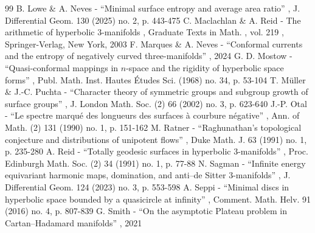 \documentclass[11pt]{article}
\theoremstyle{plain}
\theoremstyle{definition}
\begin{document}
\begin{thebibliography}{99}
 B. Lowe \& A. Neves - “Minimal surface entropy and average area ratio” , J. Differential Geom. 130 (2025) no. 2, p. 443-475
 C. Maclachlan \& A. Reid - The arithmetic of hyperbolic $3$-manifolds , Graduate Texts in Math. , vol. 219 , Springer-Verlag, New York, 2003
 F. Marques \& A. Neves - “Conformal currents and the entropy of negatively curved three-manifolds” , 2024
 G. D. Mostow - “Quasi-conformal mappings in $n$-space and the rigidity of hyperbolic space forms” , Publ. Math. Inst. Hautes Études Sci. (1968) no. 34, p. 53-104
 T. Müller \& J.-C. Puchta - “Character theory of symmetric groups and subgroup growth of surface groups” , J. London Math. Soc. (2) 66 (2002) no. 3, p. 623-640
 J.-P. Otal - “Le spectre marqué des longueurs des surfaces à courbure négative” , Ann. of Math. (2) 131 (1990) no. 1, p. 151-162
 M. Ratner - “Raghunathan’s topological conjecture and distributions of unipotent flows” , Duke Math. J. 63 (1991) no. 1, p. 235-280
 A. Reid - “Totally geodesic surfaces in hyperbolic $3$-manifolds” , Proc. Edinburgh Math. Soc. (2) 34 (1991) no. 1, p. 77-88
 N. Sagman - “Infinite energy equivariant harmonic maps, domination, and anti–de Sitter 3-manifolds” , J. Differential Geom. 124 (2023) no. 3, p. 553-598
 A. Seppi - “Minimal discs in hyperbolic space bounded by a quasicircle at infinity” , Comment. Math. Helv. 91 (2016) no. 4, p. 807-839
 G. Smith - “On the asymptotic Plateau problem in Cartan–Hadamard manifolds” , 2021
\end{thebibliography}
\end{document}
